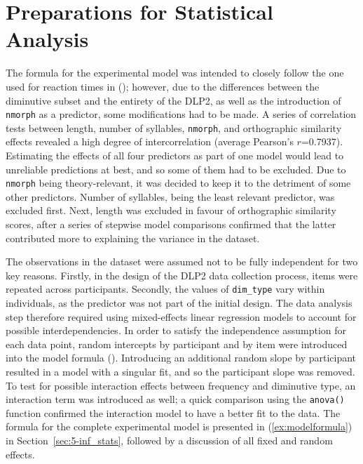 \section{Preparations for Statistical Analysis}
\label{sec:4-analysis}
The formula for the experimental model was intended to closely follow the one used for reaction times in \citeauthor{Brysbaert+etal+2016} (\citeyear{Brysbaert+etal+2016}); however, due to the differences between the diminutive subset and the entirety of the DLP2, as well as the introduction of \texttt{nmorph} as a predictor, some modifications had to be made. A series of correlation tests between length, number of syllables, \texttt{nmorph}, and orthographic similarity effects revealed a high degree of intercorrelation (average Pearson's $r$=0.7937). Estimating the effects of all four predictors as part of one model would lead to unreliable predictions at best, and so some of them had to be excluded. Due to \texttt{nmorph} being theory-relevant, it was decided to keep it to the detriment of some other predictors. Number of syllables, being the least relevant predictor, was excluded first. Next, length was excluded in favour of orthographic similarity scores, after a series of stepwise model comparisons confirmed that the latter contributed more to explaining the variance in the dataset.

 The observations in the dataset were assumed not to be fully independent for two key reasons.  Firstly, in the design of the DLP2 data collection process, items were repeated across participants. Secondly, the values of \texttt{dim\_type} vary within individuals, as the predictor was not part of the initial design. The data analysis step therefore required using mixed-effects linear regression models to account for possible interdependencies. In order to satisfy the independence assumption for each data point, random intercepts by participant and by item were introduced into the model formula (\cite{Winter+2019}). Introducing an additional random slope by participant resulted in a model with a singular fit, and so the participant slope was removed. To test for possible interaction effects between frequency and diminutive type, an interaction term was introduced as well; a quick comparison using the \texttt{anova()} function confirmed the interaction model to have a better fit to the data. The formula for the complete experimental model is presented in (\ref{ex:modelformula}) in Section~\ref{sec:5-inf_stats}, followed by a discussion of all fixed and random effects.

